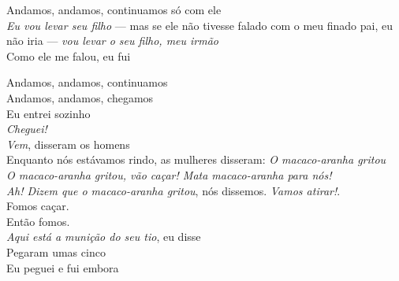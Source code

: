 \bigskip

\begin{linenumbers}
 
\noindent   Andamos, andamos, continuamos só com ele\\
  \textit{Eu vou levar seu filho} --- mas se ele não tivesse falado com o meu finado pai, eu não iria --- \textit{vou levar o seu filho, meu irmão}\\
  Como ele me falou, eu fui
 
\end{linenumbers}

\bigskip

\begin{linenumbers}
 
\noindent   Andamos, andamos, continuamos\\
  Andamos, andamos, chegamos\\
  Eu entrei sozinho\\
  \textit{Cheguei!}\\
  \textit{Vem}, disseram os homens\\
  Enquanto nós estávamos rindo, as mulheres disseram: \textit{O macaco-aranha gritou}\\
  \textit{O macaco-aranha gritou, vão caçar! Mata macaco-aranha para nós!}\\
  \textit{Ah! Dizem que o macaco-aranha gritou}, nós dissemos. \textit{Vamos atirar!}.\\
  Fomos caçar.\\
  Então fomos.\\
  \textit{Aqui está a munição do seu tio}, eu disse\\
  Pegaram umas cinco\\
  Eu peguei e fui embora

\end{linenumbers}

